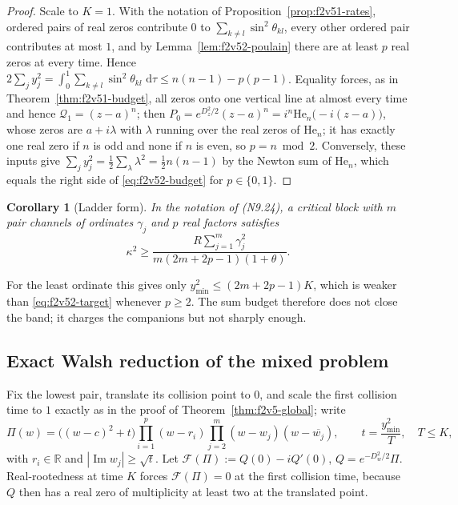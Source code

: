 \documentclass[11pt]{article}
\newtheorem{corollary}[theorem]{Corollary}
\theoremstyle{definition}
\theoremstyle{remark}
\newcommand{\dd}{\,\mathrm d}
\begin{document}
\begin{proof}
Scale to \(K=1\).  With the notation of
Proposition~\ref{prop:f2v51-rates}, ordered pairs of real zeros
contribute \(0\) to \(\sum_{k\ne l}\sin^2\theta_{kl}\), every other
ordered pair contributes at most \(1\), and by
Lemma~\ref{lem:f2v52-poulain} there are at least \(p\) real zeros at
every time.  Hence
\(2\sum_jy_j^2=\int_0^1\sum_{k\ne l}\sin^2\theta_{kl}\,\dd\tau
 \le n(n-1)-p(p-1)\).  Equality forces, as in
Theorem~\ref{thm:f2v51-budget}, all zeros onto one vertical line at
almost every time and hence \(\mathcal Q_1=(z-a)^n\); then
\(P_0=e^{D_z^2/2}(z-a)^n=i^n\mathrm{He}_n\bigl(-i(z-a)\bigr)\), whose
zeros are \(a+i\lambda\) with \(\lambda\) running over the real zeros of
\(\mathrm{He}_n\); it has exactly one real zero if
\(n\) is odd and none if \(n\) is even, so \(p=n\bmod2\).  Conversely,
these inputs give \(\sum_jy_j^2=\tfrac12\sum_\lambda\lambda^2
 =\tfrac12n(n-1)\) by the Newton sum of \(\mathrm{He}_n\), which equals
the right side of \eqref{eq:f2v52-budget} for \(p\in\{0,1\}\).
\end{proof}

\begin{corollary}[Ladder form]
\label{cor:f2v52-ladder}
In the notation of \textup{(N9.24)}, a critical block with \(m\) pair
channels of ordinates \(\gamma_j\) and \(p\) real factors satisfies
\begin{equation}
 \kappa^2\ge\frac{R\sum_{j=1}^m\gamma_j^2}{m(2m+2p-1)(1+\theta)}.
 \label{eq:f2v52-ladder}
\end{equation}
\end{corollary}

For the least ordinate this gives only \(y_{\min}^2\le(2m+2p-1)K\), which
is weaker than \eqref{eq:f2v52-target} whenever \(p\ge2\).  The sum
budget therefore does not close the band; it charges the companions but
not sharply enough.

\subsection{Exact Walsh reduction of the mixed problem}

Fix the lowest pair, translate its collision point to \(0\), and scale
the first collision time to \(1\) exactly as in the proof of
Theorem~\ref{thm:f2v5-global}; write
\begin{equation}
 \Pi(w)=\bigl((w-c)^2+t\bigr)\prod_{i=1}^p(w-r_i)
 \prod_{j=2}^m(w-w_j)(w-\overline{w_j}),
 \qquad t=\frac{y_{\min}^2}{T},\quad T\le K,
 \label{eq:f2v52-pi}
\end{equation}
with \(r_i\in\mathbb R\) and \(|\operatorname{Im}w_j|\ge\sqrt t\).  Let
\(\mathcal F(\Pi):=Q(0)-iQ'(0)\), \(Q=e^{-D_w^2/2}\Pi\).  Real-rootedness
at time \(K\) forces \(\mathcal F(\Pi)=0\) at the first collision time,
because \(Q\) then has a real zero of multiplicity at least two at the
translated point.
\end{document}
